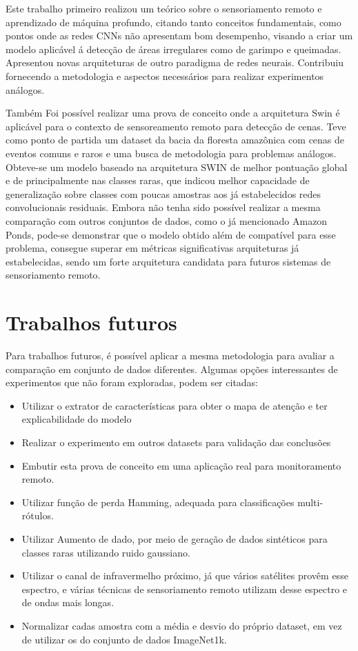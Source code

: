 
Este trabalho primeiro realizou um teórico sobre o sensoriamento remoto e aprendizado de máquina profundo, citando tanto conceitos fundamentais, como pontos onde as redes CNNs não apresentam bom desempenho, visando a criar um modelo aplicável á detecção de áreas irregulares como de garimpo e queimadas. Apresentou novas arquiteturas de outro paradigma de redes neurais. Contribuiu fornecendo a metodologia e aspectos necessários para realizar experimentos análogos.

Também Foi possível realizar uma prova de conceito onde a arquitetura Swin é aplicável para o contexto de sensoreamento remoto para detecção de cenas.  Teve como ponto de partida um dataset da bacia da floresta amazônica com cenas de eventos comuns e raros e uma busca de metodologia para problemas análogos. Obteve-se um modelo baseado na arquitetura SWIN de melhor pontuação global e de principalmente nas classes raras, que indicou melhor capacidade de generalização sobre classes com poucas amostras aos já estabelecidos redes convolucionais residuais.
Embora não tenha sido possível realizar a mesma comparação com outros conjuntos de dados, como o já mencionado Amazon Ponds, pode-se demonstrar que o modelo obtido além de compatível para esse problema, consegue superar em métricas significativas arquiteturas já estabelecidas, sendo um forte arquitetura candidata para futuros sistemas de sensoriamento remoto.

\section{Trabalhos futuros}

Para trabalhos futuros, é possível aplicar a mesma metodologia para avaliar a comparação em conjunto de dados diferentes. Algumas opções interessantes de experimentos que não foram exploradas, podem ser citadas:
\begin{itemize}
    \item Utilizar o extrator de características para obter o mapa de atenção e ter explicabilidade do modelo
    \item Realizar o experimento em outros datasets para validação das conclusões
    \item Embutir esta prova de conceito em uma aplicação real para monitoramento remoto.
    \item Utilizar função de perda Hamming, adequada para classificações multi-rótulos.
    \item Utilizar Aumento de dado, por meio de geração de dados sintéticos para classes raras utilizando ruido gaussiano.
    \item Utilizar o canal de infravermelho próximo, já que vários satélites provêm esse espectro, e várias técnicas de sensoriamento remoto utilizam desse espectro e de ondas mais longas.
    \item Normalizar cadas amostra com a média e desvio do próprio dataset, em vez de utilizar os do conjunto de dados ImageNet1k.
\end{itemize}


